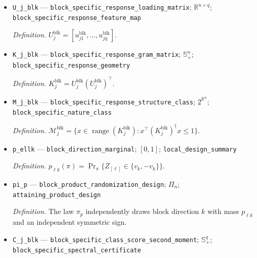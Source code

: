 \documentclass{article}
\begin{document}
\begin{itemize}
  \par\smallskip\noindent\emph{Definition.} \(u^{\mathrm{blk}}_{j\ell}=E_\ell\sum_{k=1}^3\sqrt{d_{j\ell k}}h_k\).
  \item \texttt{U\_\allowbreak{}j\_\allowbreak{}blk} --- \texttt{block\_\allowbreak{}specific\_\allowbreak{}response\_\allowbreak{}loading\_\allowbreak{}matrix}; \(\mathbb R^{n\times q}\); \texttt{block\_\allowbreak{}specific\_\allowbreak{}response\_\allowbreak{}feature\_\allowbreak{}map}
  \par\smallskip\noindent\emph{Definition.} \(U_j^{\mathrm{blk}}=[u^{\mathrm{blk}}_{j1},\ldots,u^{\mathrm{blk}}_{jq}]\).
  \item \texttt{K\_\allowbreak{}j\_\allowbreak{}blk} --- \texttt{block\_\allowbreak{}specific\_\allowbreak{}response\_\allowbreak{}gram\_\allowbreak{}matrix}; \(\mathbb S_+^n\); \texttt{block\_\allowbreak{}specific\_\allowbreak{}response\_\allowbreak{}geometry}
  \par\smallskip\noindent\emph{Definition.} \(K_j^{\mathrm{blk}}=U_j^{\mathrm{blk}}(U_j^{\mathrm{blk}})^\top\).
  \item \texttt{M\_\allowbreak{}j\_\allowbreak{}blk} --- \texttt{block\_\allowbreak{}specific\_\allowbreak{}response\_\allowbreak{}structure\_\allowbreak{}class}; \(2^{\mathbb R^n}\); \texttt{block\_\allowbreak{}specific\_\allowbreak{}nature\_\allowbreak{}class}
  \par\smallskip\noindent\emph{Definition.} \(\mathcal M_j^{\mathrm{blk}}=\{x\in\operatorname{range}(K_j^{\mathrm{blk}}):x^\top(K_j^{\mathrm{blk}})^\dagger x\le1\}\).
  \item \texttt{p\_\allowbreak{}ellk} --- \texttt{block\_\allowbreak{}direction\_\allowbreak{}marginal}; \([0,1]\); \texttt{local\_\allowbreak{}design\_\allowbreak{}summary}
  \par\smallskip\noindent\emph{Definition.} \(p_{\ell k}(\pi)=\Pr_\pi\{Z_{[\ell]}\in\{v_k,-v_k\}\}\).
  \item \texttt{pi\_\allowbreak{}p} --- \texttt{block\_\allowbreak{}product\_\allowbreak{}randomization\_\allowbreak{}design}; \(\Pi_n\); \texttt{attaining\_\allowbreak{}product\_\allowbreak{}design}
  \par\smallskip\noindent\emph{Definition.} The law \(\pi_p\) independently draws block direction \(k\) with mass \(p_{\ell k}\) and an independent symmetric sign.
  \item \texttt{C\_\allowbreak{}j\_\allowbreak{}blk} --- \texttt{block\_\allowbreak{}specific\_\allowbreak{}class\_\allowbreak{}score\_\allowbreak{}second\_\allowbreak{}moment}; \(\mathbb S_+^q\); \texttt{block\_\allowbreak{}specific\_\allowbreak{}spectral\_\allowbreak{}certificate}

\end{itemize}
\end{document}
